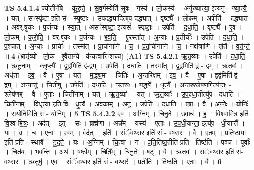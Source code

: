 \documentclass[17pt]{extarticle}
\begin{document}
                  \newline
                                \textbf{ TS 5.4.1.4} \newline
                  ज्योतीꣳ॑षि । कु॒रु॒ते॒ । सु॒व॒र्गस्येति॑ सुवः - गस्य॑ । लो॒कस्य॑ । अनु॑ख्यात्या॒ इत्यनु॑ - ख्या॒त्यै॒ । यत् । सꣳस्पृ॑ष्टा॒ इति॒ सं - स्पृ॒ष्टाः॒ । उ॒प॒द॒द्ध्यादित्यु॑प-द॒द्ध्यात् । वृष्ट्यै᳚ । लो॒कम् । अपीति॑ । द॒द्ध्या॒त् । अव॑र्.षुकः । प॒र्जन्यः॑ । स्या॒त् । असꣳ॑स्पृष्टा॒ इत्यसं᳚ - स्पृ॒ष्टाः॒ । उपेति॑ । द॒धा॒ति॒ । वृष्ट्यै᳚ । ए॒व । लो॒कम् । क॒रो॒ति॒ । वर्.षु॑कः । प॒र्जन्यः॑ । भ॒व॒ति॒ । पु॒रस्ता᳚त् । अ॒न्याः । प्र॒तीचीः᳚ । उपेति॑ । द॒धा॒ति॒ । प॒श्चात् । अ॒न्याः । प्राचीः᳚ । तस्मा᳚त् । प्रा॒चीना॑नि । च॒ । प्र॒ती॒चीना॑नि । च॒ । नक्ष॑त्राणि । एति॑ । व॒र्त॒न्ते॒ ॥ \textbf{  4} \newline
                  \newline
                      (भ्रातृ॑व्यो - लो॒क - ए॒वैतान्ये - क॑चत्वारिꣳशच्च)  \textbf{(A1)} \newline \newline
                                \textbf{ TS 5.4.2.1} \newline
                  ऋ॒त॒व्याः᳚ । उपेति॑ । द॒धा॒ति॒ । ऋ॒तू॒नाम् । क्लृप्त्यै᳚ । द्व॒द्वंमिति॑ द्वं-द्वम् । उपेति॑ । द॒धा॒ति॒ । तस्मा᳚त् । द्व॒द्वंमिति॑ द्वं - द्वम् । ऋ॒तवः॑ । अधृ॑ता । इ॒व॒ । वै । ए॒षा । यत् । म॒द्ध्य॒मा । चितिः॑ । अ॒न्तरि॑क्षम् । इ॒व॒ । वै । ए॒षा । द्व॒द्वंमिति॑ द्वं - द्वम् । अ॒न्यासु॑ । चिती॑षु । उपेति॑ । द॒धा॒ति॒ । चत॑स्रः । मद्ध्ये᳚ । धृत्यै᳚ । अ॒न्त॒श्श्लेष॑ण॒मित्य॑न्तः - श्लेष॑णम् । वै । ए॒ताः । चिती॑नाम् । यत् । ऋ॒त॒व्याः᳚ । यत् । ऋ॒त॒व्याः᳚ । उ॒प॒दधा॒तीत्यु॑प - दधा॑ति । चिती॑नाम् । विधृ॑त्या॒ इति॒ वि - धृ॒त्यै॒ । अव॑काम् । अनु॑ । उपेति॑ । द॒धा॒ति॒ । ए॒षा । वै । अ॒ग्नेः । योनिः॑ । सयो॑नि॒मिति॒ स - यो॒नि॒म् । \textbf{  5} \newline
                  \newline
                                \textbf{ TS 5.4.2.2} \newline
                  ए॒व । अ॒ग्निम् । चि॒नु॒ते॒ । उ॒वाच॑ । ह॒ । वि॒श्वामि॑त्र॒ इति॑ वि॒श्व-मि॒त्रः॒ । अद॑त् । इत् । सः । ब्रह्म॑णा । अन्न᳚म् । यस्य॑ । ए॒ताः । उ॒प॒धी॒यान्ता॒ इत्यु॑प - धी॒यान्तै᳚ । यः । उ॒ । च॒ । ए॒नाः॒ । ए॒वम् । वेद॑त् । इति॑ । सं॒ॅव॒थ्स॒र इति॑ सं - व॒थ्स॒रः । वै । ए॒तम् । प्र॒ति॒ष्ठाया॒ इति॑ प्रति - स्थायै᳚ । नु॒द॒ते॒ । यः । अ॒ग्निम् । चि॒त्वा । न । प्र॒ति॒तिष्ठ॒तीति॑ प्रति - तिष्ठ॑ति । पञ्च॑ । पूर्वाः᳚ । चित॑यः । भ॒व॒न्ति॒ । अथ॑ । ष॒ष्ठीम् । चिति᳚म् । चि॒नु॒ते॒ । षट् । वै । ऋ॒तवः॑ । सं॒ॅव॒थ्स॒र इति॑ सं-व॒थ्स॒रः । ऋ॒तुषु॑ । ए॒व । सं॒ॅव॒थ्स॒र इति॑ सं - व॒थ्स॒रे । प्रतीति॑ । ति॒ष्ठ॒ति॒ । ए॒ताः । वै । \textbf{  6} \newline
\end{document}
